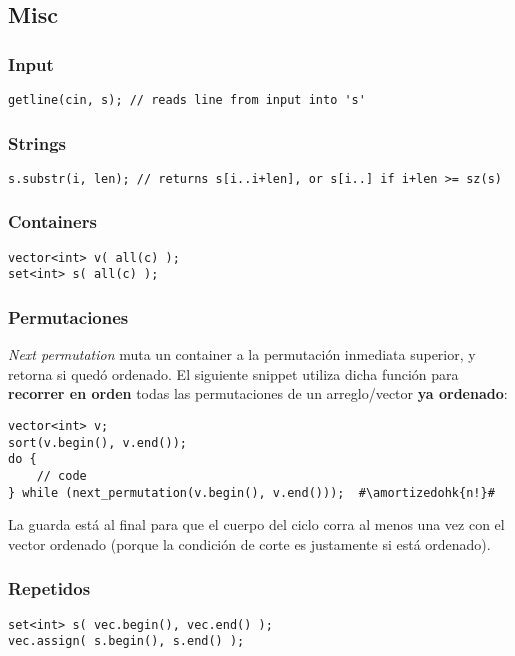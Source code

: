 
\subsection{Misc}

\subsubsection*{Input}

\begin{lstlisting}
getline(cin, s); // reads line from input into 's'
\end{lstlisting}

\subsubsection*{Strings}

\begin{lstlisting}
s.substr(i, len); // returns s[i..i+len], or s[i..] if i+len >= sz(s)
\end{lstlisting}

\subsubsection*{Containers}

\begin{lstlisting}
vector<int> v( all(c) );
set<int> s( all(c) );
\end{lstlisting}


\subsubsection*{Permutaciones}

\textit{Next permutation} muta un container a la permutación inmediata superior, y retorna si quedó ordenado. El siguiente snippet utiliza dicha función para \textbf{recorrer en orden} todas las permutaciones de un arreglo/vector \textbf{ya ordenado}:

\begin{lstlisting}
vector<int> v;
sort(v.begin(), v.end());
do {
    // code
} while (next_permutation(v.begin(), v.end()));  #\amortizedohk{n!}#
\end{lstlisting}

La guarda está al final para que el cuerpo del ciclo corra al menos una vez con el vector ordenado (porque la condición de corte es justamente si está ordenado).

\subsubsection*{Repetidos}
\begin{lstlisting}
set<int> s( vec.begin(), vec.end() );
vec.assign( s.begin(), s.end() );
\end{lstlisting}

